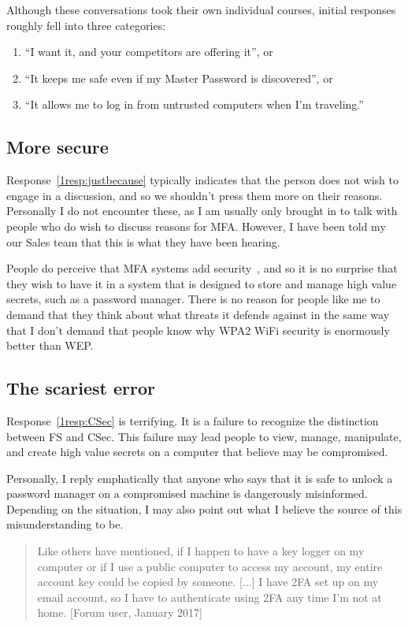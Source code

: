 \documentclass{soups}
\newcommand{\prop}[1]{\textsf{#1}}
\begin{document}
Although these conversations took their own individual courses,
initial responses roughly fell into three categories:
\begin{enumerate}
  \item “I want it, and your competitors are offering it”, or \label{1resp:justbecause}
  \item “It keeps me safe even if my Master Password is discovered”, or \label{1resp:FS}
  \item “It allows me to log in from untrusted computers when I'm traveling.”\label{1resp:CSec}
\end{enumerate}

\subsection{More secure}
Response~\ref{1resp:justbecause} typically indicates that the person does not wish to engage in a discussion, and so we shouldn't press them more on their reasons.
Personally I do not encounter these, as I am usually only brought in to talk with people who do wish to discuss reasons for MFA.\@
However, I have been told my our Sales team that this is what they have been hearing.

People do perceive that MFA systems add security~\autocites{gunsonETAL2011:CS,CristofaroDFN13},
and so it is no surprise that they wish to have it in a system that is designed to store and manage high value secrets, such as a password manager.
There is no reason for people like me to demand that they think about what threats it defends against in the same way that I don't demand that people know why WPA2 WiFi security is enormously better than WEP.

\subsection{The scariest error}

Response~\ref{1resp:CSec} is terrifying.
It is a failure to recognize the distinction between  \prop{FS} and  \prop{CSec}.
This failure may lead people to view, manage, manipulate, and create high value
secrets on a computer that believe may be compromised.

Personally, I reply emphatically that anyone who says that it is safe to unlock a password manager on a compromised machine is dangerously misinformed. Depending on the situation, I may also point out what I believe the source of this misunderstanding to be.

\begin{quotation}
  Like others have mentioned, if I happen to have a key logger on my computer or if I use a public computer to access my account, my entire account key could be copied by someone. [...] I have 2FA set up on my email account, so I have to authenticate using 2FA any time I'm not at home.
  [Forum user, January 2017]
\end{quotation}
\end{document}
